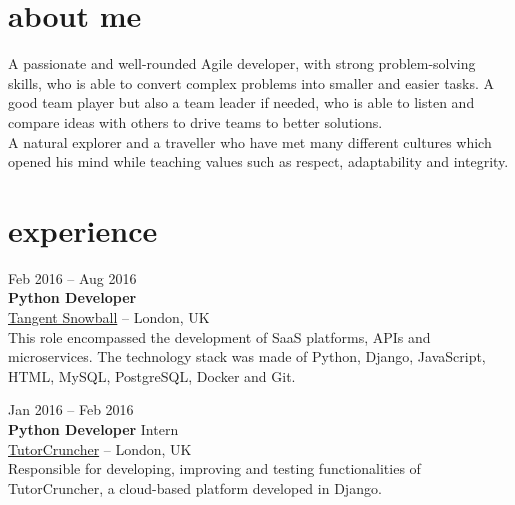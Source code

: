 \documentclass[]{friggeri-cv}
\begin{document}
\section{about me}
{
A passionate and well-rounded Agile developer, with strong problem-solving skills, who is able to convert complex problems into smaller and easier tasks. A good team player but also a team leader if needed, who is able to listen and compare ideas with others to drive teams to better solutions.
\\
A natural explorer and a traveller who have met many different cultures which opened his mind while teaching values such as respect, adaptability and integrity.}


\section{experience}

{Feb 2016 -- Aug 2016} \\
{\textbf{Python Developer}} \\
{\href{http://www.tangentsnowball.com}{Tangent Snowball}} -- {London, UK} \\
{This role encompassed the development of SaaS platforms, APIs and microservices.
The technology stack was made of Python, Django, JavaScript, HTML, MySQL, PostgreSQL, Docker and Git.}

{Jan 2016 -- Feb 2016} \\
{\textbf{Python Developer} Intern} \\
{\href{http://www.tutorcruncher.com}{TutorCruncher}} -- {London, UK} \\
{Responsible for developing, improving and testing functionalities of TutorCruncher, a cloud-based platform developed in Django.}
\end{document}
